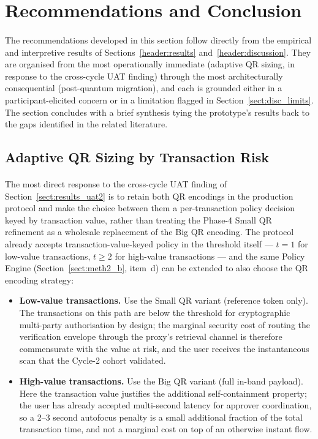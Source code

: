 \section{Recommendations and Conclusion}
\label{header:recs}

\paragraph{}The recommendations developed in this section follow directly from the empirical and interpretive results of Sections~\ref{header:results} and~\ref{header:discussion}. They are organised from the most operationally immediate (adaptive QR sizing, in response to the cross-cycle UAT finding) through the most architecturally consequential (post-quantum migration), and each is grounded either in a participant-elicited concern or in a limitation flagged in Section~\ref{sect:disc_limits}. The section concludes with a brief synthesis tying the prototype's results back to the gaps identified in the related literature.

\subsection{Adaptive QR Sizing by Transaction Risk}
\label{sect:rec_adaptive}

\paragraph{}The most direct response to the cross-cycle UAT finding of Section~\ref{sect:results_uat2} is to retain both QR encodings in the production protocol and make the choice between them a per-transaction policy decision keyed by transaction value, rather than treating the Phase-4 Small QR refinement as a wholesale replacement of the Big QR encoding. The protocol already accepts transaction-value-keyed policy in the threshold itself --- $t = 1$ for low-value transactions, $t \geq 2$ for high-value transactions --- and the same Policy Engine (Section~\ref{sect:meth2_b}, item~d) can be extended to also choose the QR encoding strategy:

\begin{itemize}
  \item \textbf{Low-value transactions.} Use the Small QR variant (reference token only). The transactions on this path are below the threshold for cryptographic multi-party authorisation by design; the marginal security cost of routing the verification envelope through the proxy's retrieval channel is therefore commensurate with the value at risk, and the user receives the instantaneous scan that the Cycle-2 cohort validated.
  \item \textbf{High-value transactions.} Use the Big QR variant (full in-band payload). Here the transaction value justifies the additional self-containment property; the user has already accepted multi-second latency for approver coordination, so a 2--3 second autofocus penalty is a small additional fraction of the total transaction time, and not a marginal cost on top of an otherwise instant flow.
\end{itemize}

